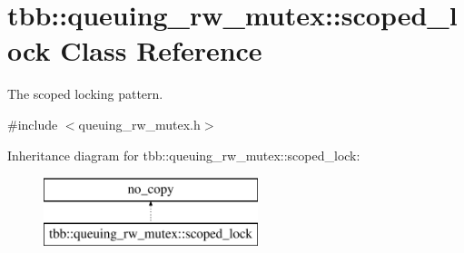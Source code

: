 \hypertarget{classtbb_1_1queuing__rw__mutex_1_1scoped__lock}{}\section{tbb\+:\+:queuing\+\_\+rw\+\_\+mutex\+:\+:scoped\+\_\+lock Class Reference}
\label{classtbb_1_1queuing__rw__mutex_1_1scoped__lock}


The scoped locking pattern.  




{\ttfamily \#include $<$queuing\+\_\+rw\+\_\+mutex.\+h$>$}

Inheritance diagram for tbb\+:\+:queuing\+\_\+rw\+\_\+mutex\+:\+:scoped\+\_\+lock\+:\begin{figure}[H]
\begin{center}
\leavevmode
\includegraphics[height=2.000000cm]{classtbb_1_1queuing__rw__mutex_1_1scoped__lock}
\end{center}
\end{figure}
